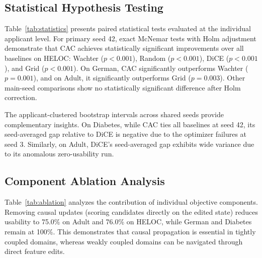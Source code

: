 \documentclass[nolineno]{paper/ieee-access/ieeeaccess}%
\newcommand{\CAC}{CAC}
\begin{document}
\begin{table}[t]
\caption{Statistical tests using saved applicant records. $n$ counts different
paired applicants; ``Seeds'' counts shared runs used for the average gap.
$b/c$ counts main-seed applicants served only by \CAC{}/only by the comparison
method. Gap and its percentile interval use paired differences across shared
seeds and resample applicants, in percentage points (pp). McNemar $p$ values
use seed 42 only, with Holm adjustment within each dataset. The average-gap
interval and main-seed test answer different questions, so they can differ
in direction or statistical significance.}
\label{tab:statistics}
\centering\footnotesize

\end{table}

\subsection{Statistical Hypothesis Testing}
Table~\ref{tab:statistics} presents paired statistical tests evaluated at the individual applicant level. For primary seed 42, exact McNemar tests with Holm adjustment demonstrate that \CAC{} achieves statistically significant improvements over all baselines on HELOC: Wachter ($p < 0.001$), Random ($p < 0.001$), DiCE ($p < 0.001$), and Grid ($p < 0.001$). On German, \CAC{} significantly outperforms Wachter ($p = 0.001$), and on Adult, it significantly outperforms Grid ($p = 0.003$). Other main-seed comparisons show no statistically significant difference after Holm correction.

The applicant-clustered bootstrap intervals across shared seeds provide complementary insights. On Diabetes, while \CAC{} ties all baselines at seed 42, its seed-averaged gap relative to DiCE is negative due to the optimizer failures at seed 3. Similarly, on Adult, DiCE's seed-averaged gap exhibits wide variance due to its anomalous zero-usability run.

\subsection{Component Ablation Analysis}
Table~\ref{tab:ablation} analyzes the contribution of individual objective components. Removing causal updates (scoring candidates directly on the edited state) reduces usability to 75.0\% on Adult and 76.0\% on HELOC, while German and Diabetes remain at 100\%. This demonstrates that causal propagation is essential in tightly coupled domains, whereas weakly coupled domains can be navigated through direct feature edits.
\end{document}
